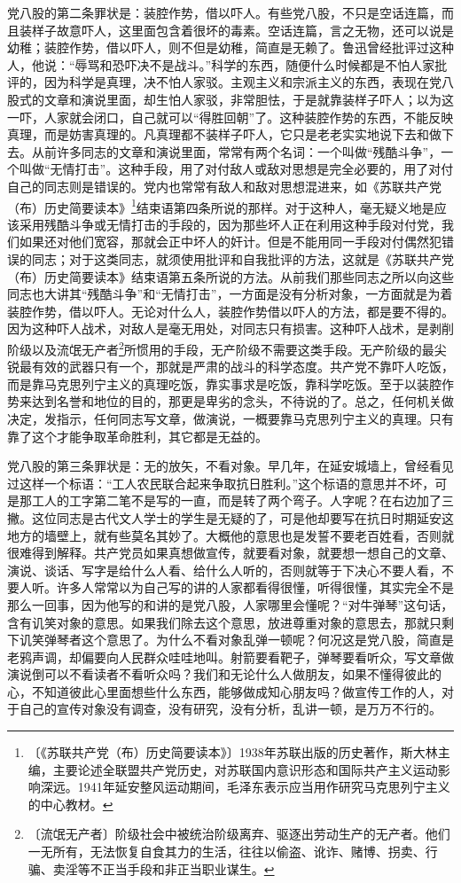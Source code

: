 \documentclass[12pt,UTF-8,openany]{ctexbook}
\begin{document}
\begin{large}
    党八股的第二条罪状是：装腔作势，借以吓人。有些党八股，不只是空话连篇，而且装样子故意吓人，这里面包含着很坏的毒素。空话连篇，言之无物，还可以说是幼稚；装腔作势，借以吓人，则不但是幼稚，简直是无赖了。鲁迅曾经批评过这种人，他说：“辱骂和恐吓决不是战斗。”科学的东西，随便什么时候都是不怕人家批评的，因为科学是真理，决不怕人家驳。主观主义和宗派主义的东西，表现在党八股式的文章和演说里面，却生怕人家驳，非常胆怯，于是就靠装样子吓人；以为这一吓，人家就会闭口，自己就可以“得胜回朝”了。这种装腔作势的东西，不能反映真理，而是妨害真理的。凡真理都不装样子吓人，它只是老老实实地说下去和做下去。从前许多同志的文章和演说里面，常常有两个名词：一个叫做“残酷斗争”，一个叫做“无情打击”。这种手段，用了对付敌人或敌对思想是完全必要的，用了对付自己的同志则是错误的。党内也常常有敌人和敌对思想混进来，如《苏联共产党（布）历史简要读本》\footnote{〔《苏联共产党（布）历史简要读本》〕1938年苏联出版的历史著作，斯大林主编，主要论述全联盟共产党历史，对苏联国内意识形态和国际共产主义运动影响深远。1941年延安整风运动期间，毛泽东表示应当用作研究马克思列宁主义的中心教材。}结束语第四条所说的那样。对于这种人，毫无疑义地是应该采用残酷斗争或无情打击的手段的，因为那些坏人正在利用这种手段对付党，我们如果还对他们宽容，那就会正中坏人的奸计。但是不能用同一手段对付偶然犯错误的同志；对于这类同志，就须使用批评和自我批评的方法，这就是《苏联共产党（布）历史简要读本》结束语第五条所说的方法。从前我们那些同志之所以向这些同志也大讲其“残酷斗争”和“无情打击”，一方面是没有分析对象，一方面就是为着装腔作势，借以吓人。无论对什么人，装腔作势借以吓人的方法，都是要不得的。因为这种吓人战术，对敌人是毫无用处，对同志只有损害。这种吓人战术，是剥削阶级以及流氓无产者\footnote{〔流氓无产者〕阶级社会中被统治阶级离弃、驱逐出劳动生产的无产者。他们一无所有，无法恢复自食其力的生活，往往以偷盗、讹诈、赌博、拐卖、行骗、卖淫等不正当手段和非正当职业谋生。}所惯用的手段，无产阶级不需要这类手段。无产阶级的最尖锐最有效的武器只有一个，那就是严肃的战斗的科学态度。共产党不靠吓人吃饭，而是靠马克思列宁主义的真理吃饭，靠实事求是吃饭，靠科学吃饭。至于以装腔作势来达到名誉和地位的目的，那更是卑劣的念头，不待说的了。总之，任何机关做决定，发指示，任何同志写文章，做演说，一概要靠马克思列宁主义的真理。只有靠了这个才能争取革命胜利，其它都是无益的。
    
    党八股的第三条罪状是：无的放矢，不看对象。早几年，在延安城墙上，曾经看见过这样一个标语：“工人农民联合起来争取抗日胜利。”这个标语的意思并不坏，可是那工人的工字第二笔不是写的一直，而是转了两个弯子。人字呢？在右边加了三撇。这位同志是古代文人学士的学生是无疑的了，可是他却要写在抗日时期延安这地方的墙壁上，就有些莫名其妙了。大概他的意思也是发誓不要老百姓看，否则就很难得到解释。共产党员如果真想做宣传，就要看对象，就要想一想自己的文章、演说、谈话、写字是给什么人看、给什么人听的，否则就等于下决心不要人看，不要人听。许多人常常以为自己写的讲的人家都看得很懂，听得很懂，其实完全不是那么一回事，因为他写的和讲的是党八股，人家哪里会懂呢？“对牛弹琴”这句话，含有讥笑对象的意思。如果我们除去这个意思，放进尊重对象的意思去，那就只剩下讥笑弹琴者这个意思了。为什么不看对象乱弹一顿呢？何况这是党八股，简直是老鸦声调，却偏要向人民群众哇哇地叫。射箭要看靶子，弹琴要看听众，写文章做演说倒可以不看读者不看听众吗？我们和无论什么人做朋友，如果不懂得彼此的心，不知道彼此心里面想些什么东西，能够做成知心朋友吗？做宣传工作的人，对于自己的宣传对象没有调查，没有研究，没有分析，乱讲一顿，是万万不行的。
    

\end{large}
\end{document}
